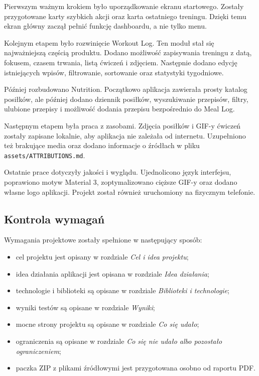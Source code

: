 \documentclass[12pt,a4paper]{article}
\begin{document}
Pierwszym ważnym krokiem było uporządkowanie ekranu startowego. Zostały przygotowane karty szybkich akcji oraz karta ostatniego treningu. Dzięki temu ekran główny zaczął pełnić funkcję dashboardu, a nie tylko menu.

Kolejnym etapem było rozwinięcie Workout Log. Ten moduł stał się najważniejszą częścią produktu. Dodano możliwość zapisywania treningu z datą, fokusem, czasem trwania, listą ćwiczeń i zdjęciem. Następnie dodano edycję istniejących wpisów, filtrowanie, sortowanie oraz statystyki tygodniowe.

Później rozbudowano Nutrition. Początkowo aplikacja zawierała prosty katalog posiłków, ale później dodano dziennik posiłków, wyszukiwanie przepisów, filtry, ulubione przepisy i możliwość dodania przepisu bezpośrednio do Meal Log.

Następnym etapem była praca z zasobami. Zdjęcia posiłków i GIF-y ćwiczeń zostały zapisane lokalnie, aby aplikacja nie zależała od internetu. Uzupełniono też brakujące media oraz dodano informacje o źródłach w pliku \texttt{assets/ATTRIBUTIONS.md}.

Ostatnie prace dotyczyły jakości i wyglądu. Ujednolicono język interfejsu, poprawiono motyw Material 3, zoptymalizowano cięższe GIF-y oraz dodano własne logo aplikacji. Projekt został również uruchomiony na fizycznym telefonie.

\subsection{Kontrola wymagań}

Wymagania projektowe zostały spełnione w następujący sposób:

\begin{itemize}
    \item cel projektu jest opisany w rozdziale \textit{Cel i idea projektu};
    \item idea działania aplikacji jest opisana w rozdziale \textit{Idea działania};
    \item technologie i biblioteki są opisane w rozdziale \textit{Biblioteki i technologie};
    \item wyniki testów są opisane w rozdziale \textit{Wyniki};
    \item mocne strony projektu są opisane w rozdziale \textit{Co się udało};
    \item ograniczenia są opisane w rozdziale \textit{Co się nie udało albo pozostało ograniczeniem};
    \item paczka ZIP z plikami źródłowymi jest przygotowana osobno od raportu PDF.
\end{itemize}
\end{document}
